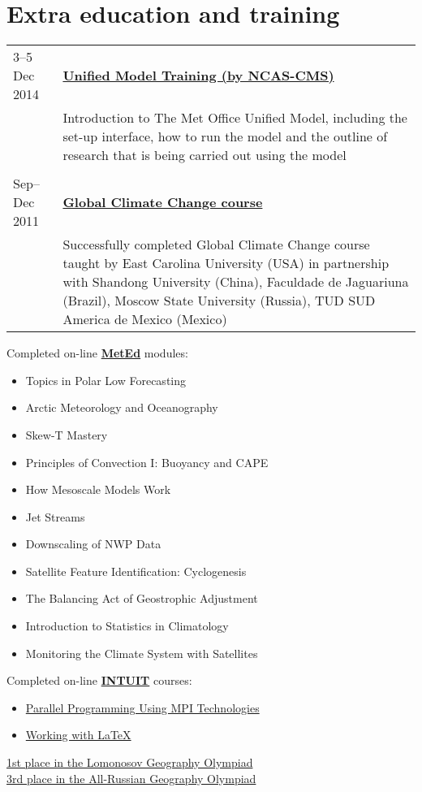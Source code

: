 \documentclass[a4paper,10pt]{article}
\newlength{\mycol}
\begin{document}
\section{Extra education and training}
\begin{tabu} to 
{\small 3--5 Dec} 2014 & \textbf{\href{http://cms.ncas.ac.uk/wiki/UmTraining}{Unified Model Training (by NCAS-CMS)}} \\
& Introduction to The Met Office Unified Model, including the set-up interface, how to run the model and the outline of research that is being carried out using the model\\
\\

{\small Sep--Dec} 2011 & \textbf{\href{http://gcc.aos.ecu.edu/}{Global Climate Change course}} \\
& Successfully completed Global Climate Change course taught by East Carolina University (USA) in partnership with Shandong University (China), Faculdade de Jaguariuna (Brazil), Moscow State University (Russia), TUD SUD America de Mexico (Mexico)
\end{tabu}

\vspace{.1in}
Completed on-line \textbf{\href{https://www.meted.ucar.edu/}{MetEd}} modules:
\begin{itemize} \renewcommand{\labelitemi}{\scriptsize$\blacksquare$} 
        \item Topics in Polar Low Forecasting
        \item Arctic Meteorology and Oceanography
        \item Skew-T Mastery
        \item Principles of Convection I: Buoyancy and CAPE
        \item How Mesoscale Models Work
        \item Jet Streams
        \item Downscaling of NWP Data
        \item Satellite Feature Identification: Cyclogenesis
        \item The Balancing Act of Geostrophic Adjustment
        \item Introduction to Statistics in Climatology
        \item Monitoring the Climate System with Satellites
\end{itemize}

\vspace{.1in}
Completed on-line \textbf{\href{http://www.intuit.ru/en/node/32/}{INTUIT}} courses:
\begin{itemize} \renewcommand{\labelitemi}{\scriptsize$\blacksquare$} 
        \item {\href{http://www.intuit.ru/sites/default/files/diploma/d/e/n/n/i/NOU__INTUIT_-2-699590-OLF.jpg}{Parallel Programming Using MPI Technologies}}
        \item {\href{http://www.intuit.ru/sites/default/files/diploma/d/e/n/n/i/Nekommercheskoe_obrazovatelnoe_chastnoe_uchrejdenie_vyisshego_professionalnogo__obrazovaniya__Natsionalnyiy_otkryityiy_universitet__INTUIT_-2-790692-OLF.jpg}{Working with LaTeX}}
\end{itemize}

\vspace{.1in}
\href{http://lomonosov.msu.ru/}{1st place in the Lomonosov Geography Olympiad} \\
\href{http://rosolymp.ru/index.php?option=com_content&view=article&id=6455&Itemid=917}{3rd place in the All-Russian Geography Olympiad}
\end{document}
